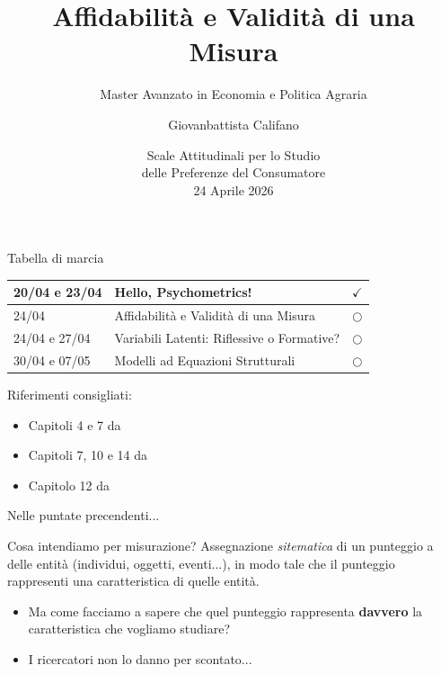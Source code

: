 \documentclass{beamer}
\title[Lezione 2]{Affidabilità e Validità di una Misura}
\subtitle{Master Avanzato in Economia e Politica Agraria}
\author{Giovanbattista Califano}
\date[Portici, 24/04/2025]{Scale Attitudinali per lo Studio \\ delle Preferenze del Consumatore \\ 24 Aprile 2026}
\institute[UNINA]{Università degli Studi di Napoli Federico II, giovanbattista.califano@unina.it}
\begin{document}
\frame{\titlepage}

\begin{frame}{Tabella di marcia}
    \begin{center}
        \begin{tabular}{|l|l|c|}
        \hline
        20/04 e 23/04 &  Hello, Psychometrics! & $\checkmark$ \\
        \hline
        24/04 & Affidabilità e Validità di una Misura & $\bigcirc$ \\
        \hline
        24/04 e 27/04 & Variabili Latenti: Riflessive o Formative? & $\bigcirc$ \\
        \hline
        30/04 e 07/05 & Modelli ad Equazioni Strutturali & $\bigcirc$ \\
        \hline
        \end{tabular}
    \end{center}
\vspace{0.1cm}
\footnotesize
Riferimenti consigliati: \\
\begin{itemize}
    \item Capitoli 4 e 7 da \cite{jhangiani2019research}
    \item Capitoli 7, 10 e 14 da \cite{olivero2022psicologia}
    \item Capitolo 12 da \cite{mehmetoglu2022applied}
\end{itemize}
\scriptsize


\end{frame}

\begin{frame}{Nelle puntate precendenti...}
\begin{block}{Cosa intendiamo per misurazione?}
    Assegnazione \textit{sitematica} di un punteggio a delle entità (individui, oggetti, eventi...), in modo tale che il punteggio rappresenti una caratteristica di quelle entità.
\end{block}
\pause
\begin{itemize}
    \item Ma come facciamo a sapere che quel punteggio rappresenta \textbf{davvero} la caratteristica che vogliamo studiare?
    \item I ricercatori non lo danno per scontato...
\end{itemize}
\end{frame}
\end{document}
